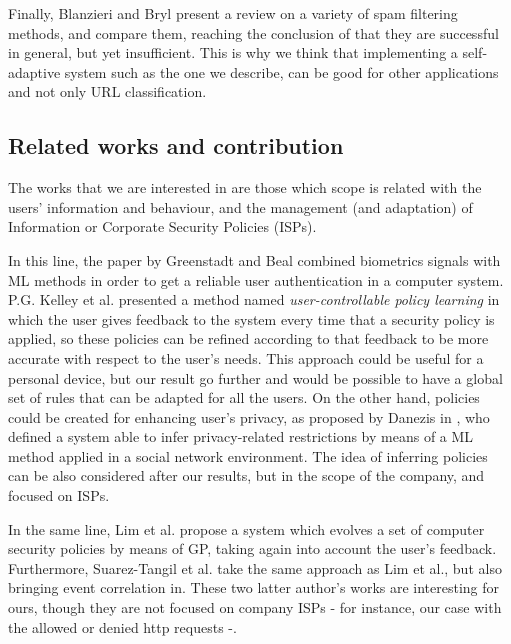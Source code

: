 \documentclass{llncs}
\begin{document}
Finally, Blanzieri and Bryl \cite{blanzieri2008} present a review on a variety of spam filtering methods, and compare them, reaching the conclusion of that they are successful in general, but yet insufficient. This is why we think that implementing a self-adaptive system such as the one we describe, can be good for other applications and not only URL classification.

%
\subsection{Related works and contribution}
\label{subsec:relatedworks}

The works that we are interested in are those which scope is related with the users' information and behaviour, and the management (and adaptation) of Information or Corporate Security Policies (ISPs).

In this line, the paper by Greenstadt and Beal \cite{cognitive_security_08} combined biometrics signals with ML methods in order to get a reliable user authentication in a computer system.
P.G. Kelley et al. \cite{user-controllable_learning_08} presented a method named \textit{user-controllable policy learning} in which the user gives feedback to the system every time that a security policy is applied, so these policies can be refined according to that feedback to be more accurate with respect to the user's needs. This approach could be useful for a personal device, but our result go further and would be possible to have a global set of rules that can be adapted for all the users.
On the other hand, policies could be created for enhancing user's privacy, as proposed by Danezis in \cite{inferring_policies_socialnetworks_09}, who defined a system able to infer privacy-related restrictions by means of a ML method applied in a social network environment. The idea of inferring policies can be also considered after our results, but in the scope of the company, and focused on ISPs.

In the same line, Lim et al. propose a system \cite{sec_policy_evolution_gp_08,pol_evol_gp_3_approaches_08} which evolves a set of computer security policies by means of GP, taking again into account the user's feedback. Furthermore, Suarez-Tangil et al. \cite{rule_generation_gp_09} take the same approach as Lim et al., but also bringing event correlation in. These two latter author's works are interesting for ours, though they are not focused on company ISPs - for instance, our case with the allowed or denied http requests -.
\end{document}
